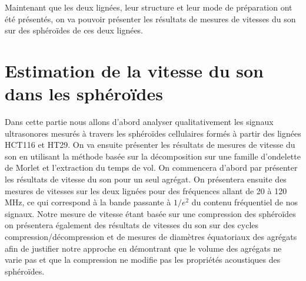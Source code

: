 Maintenant que les deux lignées, leur structure et leur mode de préparation ont été présentés, on va pouvoir présenter les résultats de mesures de vitesses du son sur des sphéroïdes de ces deux lignées.

\section{Estimation de la vitesse du son dans les sphéroïdes}
Dans cette partie nous allons d'abord analyser qualitativement les signaux ultrasonores mesurés à travers les sphéroïdes cellulaires formés à partir des lignées HCT116 et HT29. On va ensuite présenter les résultats de mesures de vitesse du son en utilisant la méthode basée sur la décomposition sur une famille d'ondelette de Morlet et l'extraction du temps de vol.  On commencera d'abord par présenter les résultats de vitesse du son pour un seul agrégat. On présentera ensuite des mesures de vitesses sur les deux lignées pour des fréquences allant de 20 à 120 MHz, ce qui correspond à la bande passante à $1/e^2$ du contenu fréquentiel de nos signaux. Notre mesure de vitesse étant basée sur une compression des sphéroïdes on présentera également des résultats de vitesses du  son sur des cycles compression/décompression et de mesures de diamètres équatoriaux des agrégats afin de justifier notre approche en démontrant que le volume des agrégats ne varie pas et que la compression ne modifie pas les propriétés acoustiques des sphéroïdes. 

